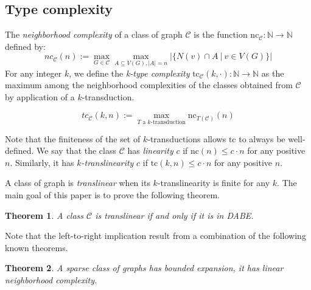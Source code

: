 \documentclass[11pt]{article}
\newtheorem{theorem}{Theorem}
\theoremstyle{definition}
\newcommand{\CC}{{\mathscr C}}
\newcommand{\N}{\mathbb{N}}
\renewcommand{\le}{\leqslant}
\newcommand{\remph}[1]{{\color{red} \emph{#1}}}
\begin{document}
\subsection{Type complexity}
\newcommand{\nc}{\text{nc}}
\newcommand{\tc}{\text{tc}}
The \remph{neighborhood complexity} of a class of graph $\CC$ is the function $\nc_{\CC} : \N \to \N$ defined by:
\[
nc_{\CC}(n) := \max_{G \in \CC} \max_{A \subseteq V(G), |A| = n} |\{ N(v) \cap A~|~v \in V(G)\}|
\]
For any integer $k$, we define the \remph{k-type complexity }$\tc_{\CC}(k, \cdot) : \N \to \N$ as the maximum among the neighborhood complexities of the classes obtained from $\CC$ by application of a $k$-transduction.

\[
tc_{\CC}(k, n) := \max_{T \text{ a $k$-transduction}} \nc_{T(\CC)}(n)
\]

Note that the finiteness of the set of $k$-transductions allows $\tc$ to always be well-defined.
We say that the class $\CC$ has \remph{linearity} $c$ if $\nc(n) \le c \cdot n$ for any positive $n$. Similarly, it has \remph{$k$-translinearity} $c$ if $\tc(k, n) \le c \cdot n$ for any positive $n$.

A class of graph is \remph{translinear} when its $k$-translinearity is finite for any $k$.
The main goal of this paper is to prove the following theorem.

\begin{theorem}
  A class $\CC$ is translinear if and only if it is in DABE.
\end{theorem}

Note that the left-to-right implication result from a combination of the following known theorems.

\begin{theorem}\label{thm:bddexp2nc}
  A sparse class of graphs has bounded expansion, it has linear neighborhood complexity.
\end{theorem}
\end{document}
